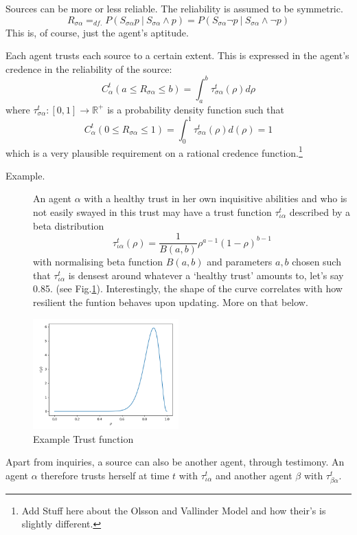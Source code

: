 \documentclass[11pt, a4paper]{article}
\newcommand{\Ssa}{S_{\sigma\alpha}}
\newcommand{\sa}{\sigma\alpha}
\newcommand\given[1][]{\:#1\vert\:}
\begin{document}
Sources can be more or less reliable. The reliability is assumed to be symmetric.
\[ 
R_{\sigma \alpha} =_{df.} P(\Ssa p \given \Ssa \land p) = P(\Ssa \neg p \given \Ssa \land \neg p)
\]
This is, of course, just the agent's aptitude. 

Each agent trusts each source to a certain extent. This is expressed in the agent's credence in the reliability of the source:
\[ 
    C^t_{\alpha}(a \leqslant R_{\sa} \leqslant b) = \int_a^b \tau^t_{\sa}(\rho) d\rho
\]
where $\tau^t_{\sa}: [0,1] \rightarrow \mathbb{R}^+$ is a probability density function such that 
\[
    C^t_{\alpha}(0 \leqslant R_{\sa} \leqslant 1) =  \int_0^1 \tau^t_{\sa} (\rho) d(\rho) = 1
\]which is a very plausible requirement on a rational credence function.\footnote{Add Stuff here about the Olsson and Vallinder Model and how their's is slightly different.}

\begin{description}
    \item[Example.] An agent $\alpha$ with a healthy trust in her own inquisitive abilities and who is not easily swayed in this trust may have a trust function $\tau^t_{\iota\alpha}$ described by a beta distribution
\[
    \tau^t_{\iota\alpha} (\rho) = \frac{1}{B(a,b)} \rho^{a - 1} {(1 - \rho)}^{b-1}
\]
with normalising beta function $B(a,b)$ and parameters $a, b$ chosen such that $\tau^t_{\iota\alpha}$ is densest around whatever a `healthy trust' amounts to, let's say 0.85. (see Fig.\ref{fig1}). Interestingly, the shape of the curve correlates with how resilient the funtion behaves upon updating. More on that below.
\end{description}

\begin{figure}[ht]
	\centering
    \includegraphics[width=0.5\textwidth]{Figure_1.png}
	\caption{Example Trust function}
    \label{fig1}
\end{figure}

Apart from inquiries, a source can also be another agent, through testimony. An agent $\alpha$ therefore trusts herself at time $t$ with $\tau^t_{\iota\alpha}$ and another agent $\beta$ with $\tau^t_{\beta\alpha}$.
\end{document}
